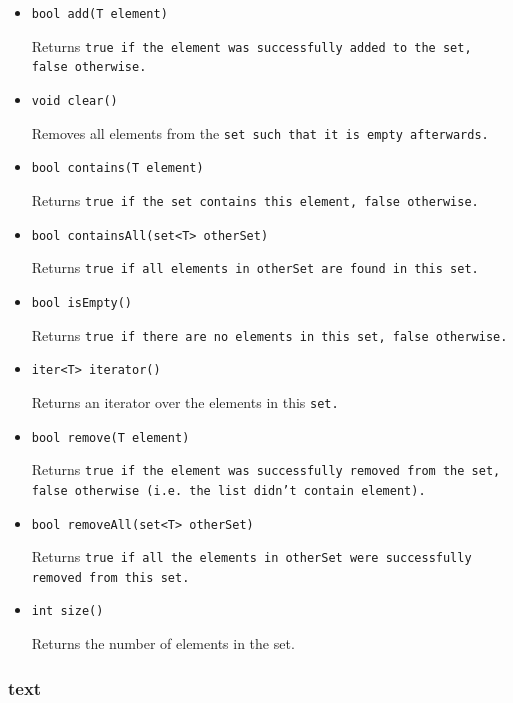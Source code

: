 \documentclass{report}
\begin{document}
\begin{itemize}

\item[] \tt bool add(T element) \rm

Returns \tt true \rm if the element was successfully added to the \tt set\rm, \tt false \rm otherwise.

\item[] \tt void clear() \rm

Removes all elements from the \tt set \rm such that it is empty afterwards.

\item[] \tt bool contains(T element) \rm

Returns \tt true \rm if the \tt set \rm contains this element, \tt false \rm otherwise.

\item[] \tt bool containsAll(set<T> otherSet) \rm

Returns \tt true \rm if all elements in \tt otherSet \rm are found in this set.

\item[] \tt bool isEmpty() \rm

Returns \tt true \rm if there are no elements in this \tt set\rm, \tt false \rm otherwise.

\item[] \tt iter<T> iterator() \rm

Returns an iterator over the elements in this \tt set\rm.

\item[] \tt bool remove(T element) \rm

Returns \tt true \rm if the element was successfully removed from the \tt set\rm, \tt false \rm otherwise (i.e. the \tt list
\rm didn't contain \tt element\rm).

\item[] \tt bool removeAll(set<T> otherSet) \rm

Returns \tt true \rm if all the elements in \tt otherSet \rm were successfully removed from this set.

\item[] \tt int size() \rm

Returns the number of elements in the set.

\end{itemize}


\subsubsection{text} %
\label{ssub:text}
\end{document}
